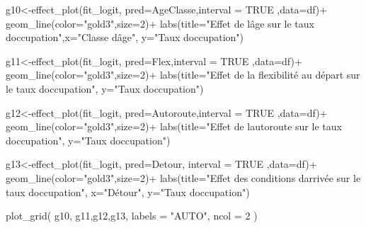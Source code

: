\documentclass[
]{book}
\newenvironment{Shaded}{\begin{snugshade}}{\end{snugshade}}
\newcommand{\AttributeTok}[1]{\textcolor[rgb]{0.77,0.63,0.00}{#1}}
\newcommand{\ConstantTok}[1]{\textcolor[rgb]{0.00,0.00,0.00}{#1}}
\newcommand{\DecValTok}[1]{\textcolor[rgb]{0.00,0.00,0.81}{#1}}
\newcommand{\FunctionTok}[1]{\textcolor[rgb]{0.00,0.00,0.00}{#1}}
\newcommand{\NormalTok}[1]{#1}
\newcommand{\OtherTok}[1]{\textcolor[rgb]{0.56,0.35,0.01}{#1}}
\newcommand{\SpecialCharTok}[1]{\textcolor[rgb]{0.00,0.00,0.00}{#1}}
\newcommand{\StringTok}[1]{\textcolor[rgb]{0.31,0.60,0.02}{#1}}
\begin{document}
\begin{Shaded}
\begin{Highlighting}[]
\NormalTok{g10}\OtherTok{\textless{}{-}}\FunctionTok{effect\_plot}\NormalTok{(fit\_logit, }\AttributeTok{pred=}\NormalTok{AgeClasse,}\AttributeTok{interval =} \ConstantTok{TRUE}\NormalTok{ ,}\AttributeTok{data=}\NormalTok{df)}\SpecialCharTok{+}
  \FunctionTok{geom\_line}\NormalTok{(}\AttributeTok{color=}\StringTok{"gold3"}\NormalTok{,}\AttributeTok{size=}\DecValTok{2}\NormalTok{)}\SpecialCharTok{+}
  \FunctionTok{labs}\NormalTok{(}\AttributeTok{title=}\StringTok{"Effet de l\textquotesingle{}âge sur le taux d\textquotesingle{}occupation"}\NormalTok{,}\AttributeTok{x=}\StringTok{"Classe d\textquotesingle{}âge"}\NormalTok{,}
       \AttributeTok{y=}\StringTok{"Taux d\textquotesingle{}occupation"}\NormalTok{)}

\NormalTok{g11}\OtherTok{\textless{}{-}}\FunctionTok{effect\_plot}\NormalTok{(fit\_logit, }\AttributeTok{pred=}\NormalTok{Flex,}\AttributeTok{interval =} \ConstantTok{TRUE}\NormalTok{  ,}\AttributeTok{data=}\NormalTok{df)}\SpecialCharTok{+}
  \FunctionTok{geom\_line}\NormalTok{(}\AttributeTok{color=}\StringTok{"gold3"}\NormalTok{,}\AttributeTok{size=}\DecValTok{2}\NormalTok{)}\SpecialCharTok{+}
  \FunctionTok{labs}\NormalTok{(}\AttributeTok{title=}\StringTok{"Effet de la flexibilité au départ sur le taux d\textquotesingle{}occupation"}\NormalTok{,}
       \AttributeTok{y=}\StringTok{"Taux d\textquotesingle{}occupation"}\NormalTok{)}


\NormalTok{g12}\OtherTok{\textless{}{-}}\FunctionTok{effect\_plot}\NormalTok{(fit\_logit, }\AttributeTok{pred=}\NormalTok{Autoroute,}\AttributeTok{interval =} \ConstantTok{TRUE}\NormalTok{  ,}\AttributeTok{data=}\NormalTok{df)}\SpecialCharTok{+}
  \FunctionTok{geom\_line}\NormalTok{(}\AttributeTok{color=}\StringTok{"gold3"}\NormalTok{,}\AttributeTok{size=}\DecValTok{2}\NormalTok{)}\SpecialCharTok{+}
  \FunctionTok{labs}\NormalTok{(}\AttributeTok{title=}\StringTok{"Effet de l\textquotesingle{}autoroute sur le taux d\textquotesingle{}occupation"}\NormalTok{,}
       \AttributeTok{y=}\StringTok{"Taux d\textquotesingle{}occupation"}\NormalTok{)}


\NormalTok{g13}\OtherTok{\textless{}{-}}\FunctionTok{effect\_plot}\NormalTok{(fit\_logit, }\AttributeTok{pred=}\NormalTok{Detour, }\AttributeTok{interval =} \ConstantTok{TRUE}\NormalTok{ ,}\AttributeTok{data=}\NormalTok{df)}\SpecialCharTok{+}
  \FunctionTok{geom\_line}\NormalTok{(}\AttributeTok{color=}\StringTok{"gold3"}\NormalTok{,}\AttributeTok{size=}\DecValTok{2}\NormalTok{)}\SpecialCharTok{+}
  \FunctionTok{labs}\NormalTok{(}\AttributeTok{title=}\StringTok{"Effet des conditions d\textquotesingle{}arrivée sur le taux d\textquotesingle{}occupation"}\NormalTok{, }\AttributeTok{x=}\StringTok{"Détour"}\NormalTok{,}
       \AttributeTok{y=}\StringTok{"Taux d\textquotesingle{}occupation"}\NormalTok{)}

\FunctionTok{plot\_grid}\NormalTok{(}
\NormalTok{  g10, g11,g12,g13,}
  \AttributeTok{labels =} \StringTok{"AUTO"}\NormalTok{, }\AttributeTok{ncol =} \DecValTok{2}
\NormalTok{)}
\end{Highlighting}
\end{Shaded}
\end{document}

